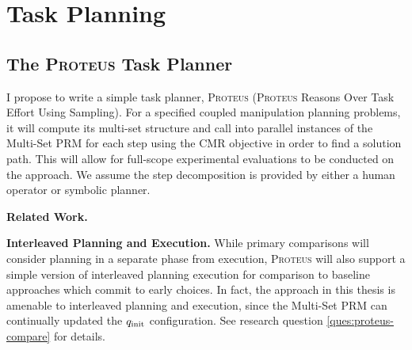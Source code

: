 \clearpage
\section{Task Planning}
\label{chap:task-planning}

\subsection{The \textsc{Proteus} Task Planner}

I propose to write a simple task planner,
\textsc{Proteus}
(\textsc{Proteus} Reasons Over Task Effort Using Sampling).
For a specified coupled manipulation planning problems,
it will compute its multi-set structure
and call into parallel instances of the Multi-Set PRM for each step
using the CMR objective
in order to find a solution path.
This will allow for full-scope experimental evaluations to be conducted
on the approach.
We assume the step decomposition is provided by either
a human operator or symbolic planner.

\textbf{Related Work.}

\textbf{Interleaved Planning and Execution.}
While primary comparisons
will consider planning in a separate phase from execution,
\textsc{Proteus} will also support a simple version of
interleaved planning execution
for comparison to baseline approaches which commit to early choices.
In fact, the approach in this thesis is
amenable to interleaved planning and execution,
since the Multi-Set PRM can continually updated
the $q_{\mbox{\scriptsize init}}$ configuration.
See research question \ref{ques:proteus-compare} for details.
